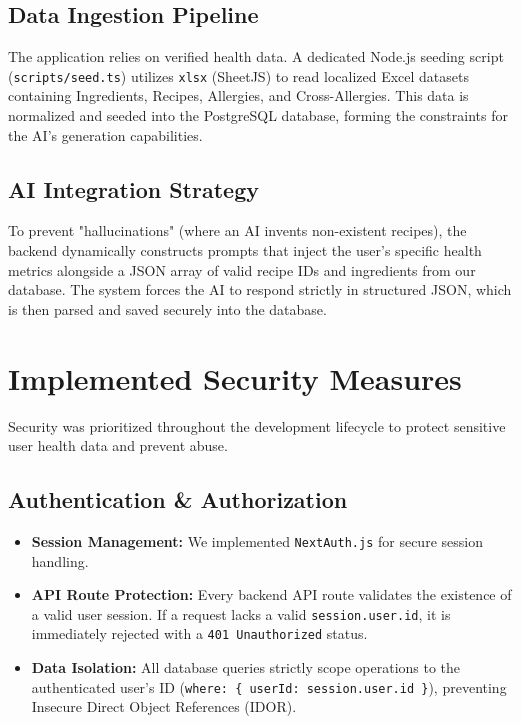 \documentclass[12pt,a4paper]{article}
\begin{document}
\subsection{Data Ingestion Pipeline}
The application relies on verified health data. A dedicated Node.js seeding script (\texttt{scripts/seed.ts}) utilizes \texttt{xlsx} (SheetJS) to read localized Excel datasets containing Ingredients, Recipes, Allergies, and Cross-Allergies. This data is normalized and seeded into the PostgreSQL database, forming the constraints for the AI's generation capabilities.

\subsection{AI Integration Strategy}
To prevent "hallucinations" (where an AI invents non-existent recipes), the backend dynamically constructs prompts that inject the user's specific health metrics alongside a JSON array of valid recipe IDs and ingredients from our database. The system forces the AI to respond strictly in structured JSON, which is then parsed and saved securely into the database.

\section{Implemented Security Measures}
Security was prioritized throughout the development lifecycle to protect sensitive user health data and prevent abuse.

\subsection{Authentication \& Authorization}
\begin{itemize}
    \item \textbf{Session Management:} We implemented \texttt{NextAuth.js} for secure session handling.
    \item \textbf{API Route Protection:} Every backend API route validates the existence of a valid user session. If a request lacks a valid \texttt{session.user.id}, it is immediately rejected with a \texttt{401 Unauthorized} status.
    \item \textbf{Data Isolation:} All database queries strictly scope operations to the authenticated user's ID (\texttt{where: \{ userId: session.user.id \}}), preventing Insecure Direct Object References (IDOR).
\end{itemize}
\end{document}
